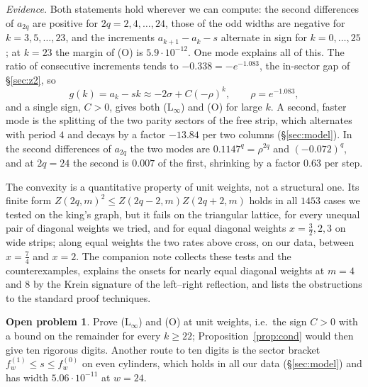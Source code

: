 \documentclass[11pt]{amsart}
\theoremstyle{definition}
\newtheorem{problem}[theorem]{Open problem}
\theoremstyle{remark}
\begin{document}
\emph{Evidence.} Both statements hold wherever we can compute: the second differences of
$a_{2q}$ are positive for $2q = 2, 4, \dots, 24$, those of the odd widths are negative for
$k = 3, 5, \dots, 23$, and the increments $a_{k+1} - a_k - s$ alternate in sign for
$k = 0, \dots, 25$; at $k = 23$ the margin of (O) is $5.9\cdot10^{-12}$. One mode explains all of
this. The ratio of consecutive increments tends to $-0.338 = -e^{-1.083}$, the in-sector gap of
\S\ref{sec:z2}, so
\[
  g(k) = a_k - sk \approx -2\sigma + C(-\rho)^k, \qquad \rho = e^{-1.083},
\]
and a single sign, $C > 0$, gives both (L$_\infty$) and (O) for large $k$. A second, faster mode is
the splitting of the two parity sectors of the free strip, which alternates with period $4$ and
decays by a factor $-13.84$ per two columns (\S\ref{sec:model}). In the second differences of
$a_{2q}$ the two modes are $0.1147^q = \rho^{2q}$ and $(-0.072)^q$, and at $2q = 24$ the second is
$0.007$ of the first, shrinking by a factor $0.63$ per step.

The convexity is a quantitative property of unit weights, not a structural one. Its finite form
$Z(2q, m)^2 \le Z(2q-2, m)Z(2q+2, m)$ holds in all $1453$ cases we tested on the king's graph, but it
fails on the triangular lattice, for every unequal pair of diagonal weights we tried, and for equal
diagonal weights $x = \tfrac32, 2, 3$ on wide strips; along equal weights the two rates above cross,
on our data, between $x = \tfrac74$ and $x = 2$. The companion note \cite{rylko2026lnote} collects these tests
and the counterexamples, explains the onsets for nearly equal diagonal weights at $m = 4$ and $8$ by
the Krein signature of the left--right reflection, and lists the obstructions to the standard proof
techniques.

\begin{problem}
Prove (L$_\infty$) and (O) at unit weights, i.e.\ the sign $C > 0$ with a bound on the remainder
for every $k \ge 22$; Proposition~\ref{prop:cond} would then give ten rigorous digits. Another
route to ten digits is the sector bracket $f^{(1)}_w \le s \le f^{(0)}_w$ on even cylinders, which
holds in all our data (\S\ref{sec:model}) and has width $5.06\cdot10^{-11}$ at $w = 24$.
\end{problem}
\end{document}
